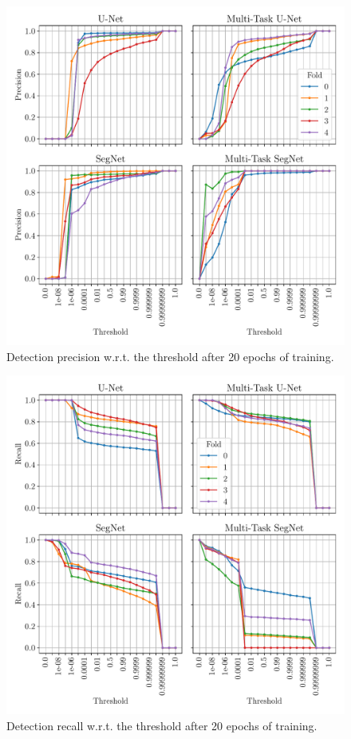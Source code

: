 \documentclass[twocolumn,superscriptaddress,aps,nofootinbib]{revtex4-1}
\begin{document}
\begin{figure}[h]
    \centering
    \includegraphics[width=\columnwidth]{resources/pdf/detection_p.pdf}
    \caption{Detection precision w.r.t. the threshold after 20 epochs of training.}
    \label{fig:detection_p}
\end{figure}

\begin{figure}[h]
    \centering
    \includegraphics[width=\columnwidth]{resources/pdf/detection_r.pdf}
    \caption{Detection recall w.r.t. the threshold after 20 epochs of training.}
    \label{fig:detection_r}
\end{figure}
\end{document}
